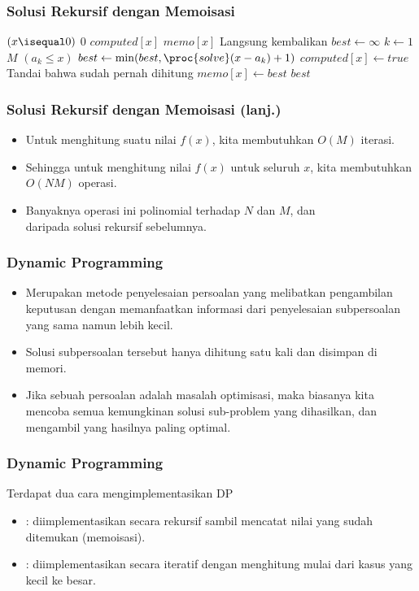 \begin{frame}
\frametitle{Solusi Rekursif dengan Memoisasi}
\begin{codebox}
\li \If $(x \isequal 0)$ \Then
\li   \Return $0$
    \End
\li \If $computed[x]$ \Then
\li   \Return $memo[x]$ \Comment Langsung kembalikan
\li \End
\li $best \gets \infty$
\li \For $k \gets 1$ \To $M$ \Do
\li   \If $(a_k \leq x)$ \Then
\li     $best \gets \min(best, \proc{solve}(x - a_k) + 1)$
      \End
    \End     
\li $computed[x] \gets true$ \Comment Tandai bahwa sudah pernah dihitung 
\li $memo[x] \gets best$
\li \Return $best$
\end{codebox}
\end{frame}

\begin{frame}
\frametitle{Solusi Rekursif dengan Memoisasi (lanj.)}
\begin{itemize}
  \item Untuk menghitung suatu nilai $f(x)$, kita membutuhkan $O(M)$ iterasi.
  \item Sehingga untuk menghitung nilai $f(x)$ untuk seluruh $x$, kita membutuhkan $O(NM)$ operasi.
  \item Banyaknya operasi ini polinomial terhadap $N$ dan $M$, dan \\  daripada solusi rekursif sebelumnya.
\end{itemize}
\end{frame}

\begin{frame} 
\frametitle{Dynamic Programming}
\begin{itemize}
  \item Merupakan metode penyelesaian persoalan yang melibatkan pengambilan keputusan dengan memanfaatkan informasi dari penyelesaian subpersoalan yang sama namun lebih kecil.
  \item Solusi subpersoalan tersebut hanya dihitung satu kali dan disimpan di memori.
  \item Jika sebuah persoalan adalah masalah optimisasi, maka biasanya kita mencoba semua kemungkinan solusi sub-problem yang dihasilkan, dan  mengambil yang hasilnya paling optimal. 
\end{itemize}
\end{frame}

\begin{frame} 
\frametitle{Dynamic Programming}
Terdapat dua cara mengimplementasikan DP
\begin{itemize}
  \item \newTerm{\ftopdown}: diimplementasikan secara rekursif sambil mencatat nilai yang sudah ditemukan (memoisasi).
  \item \newTerm{\fbottomup}: diimplementasikan secara iteratif dengan menghitung mulai dari kasus yang kecil ke besar.
  \newline
\end{itemize}
\end{frame}

